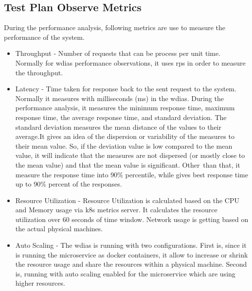 \subsection{Test Plan Observe Metrics}
\label{subse:test_plan_metrics}
During the performance analysis, following metrics are use to measure the performance of the system.
\begin{itemize}
    \item Throughput - Number of requests that can be process per unit time. Normally for \acrshort{wdias} performance observations, it uses \acrfull{rps} in order to measure the throughput.
    \item Latency - Time taken for response back to the sent request to the system. Normally it measures with milliseconds (ms) in the \acrshort{wdias}. During the performance analysis, it measures the minimum response time, maximum response time, the average response time, and standard deviation. The standard deviation measures the mean distance of the values to their average.It gives an idea of the dispersion or variability of the measures to their mean value. So, if the deviation value is low compared to the mean value, it will indicate that the measures are not dispersed (or mostly close to the mean value) and that the mean value is significant. Other than that, it measure the response time into 90\% percentile, while gives best response time up to 90\% percent of the responses.
    \item Resource Utilization - Resource Utilization is calculated based on the CPU and Memory usage via \acrshort{k8s} metrics server. It calculates the resource utilization over 60 seconds of time window. Network usage is getting based on the actual physical machines.
    \item Auto Scaling - The \acrshort{wdias} is running with two configurations. First is, since it is running the microservice as docker containers, it allow to increase or shrink the resource usage and share the resources within a physical machine. Second is, running with auto scaling enabled for the microservice which are using higher resources.
\end{itemize}
